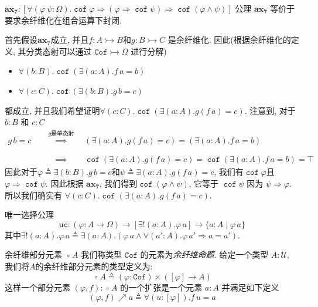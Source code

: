 \documentclass[aspectratio=169,xcolor=dvipsnames]{beamer}
\newcommand\calU{\mathcal{U}}
\newcommand{\ax}[1]{\mathbf{ax_{#1}}}
\newcommand\uc{\mathtt{uc}}
\newcommand\Cof{\mathtt{Cof}}
\DeclareMathOperator\cof{\mathtt{cof}}
\DeclareMathOperator\cofibpart{\square}
\begin{document}
\begin{frame}[shrink]{$\ax{7}:[\forall(\varphi\:\psi:\Omega).\cof\varphi\Rightarrow(\varphi\Rightarrow\cof\psi)\Rightarrow\cof(\varphi\land\psi)]$}
  公理 $\ax{7}$ 等价于要求余纤维化在组合运算下封闭.

  首先假设$\ax{7}$成立, 并且$f:A\rightarrowtail B$和$g:B\rightarrowtail C$ 是余纤维化. 因此(根据余纤维化的定义, 其分类态射可以通过 $\Cof\rightarrowtail\Omega$ 进行分解)
  \begin{itemize}
    \item $\forall(b:B).\cof(\exists(a:A).f\,a=b)$
    \item $\forall(c:C).\cof(\exists(b:B).g\,b=c)$
  \end{itemize}
  都成立, 并且我们希望证明$\forall(c:C).\cof(\exists(a:A).g(f\,a)=c)$. 注意到, 对于 $b:B$ 和 $c:C$
  \begin{align*}
    g\,b=c \quad&\stackrel{g\text{是单态射}}{\implies}\quad (\exists(a:A).g(f\,a)=c) = (\exists(a:A).f\,a=b) \\
    &\stackrel{\phantom{g\text{是单态射}}}{\implies}\quad \cof(\exists(a:A).g(f\,a)=c) = \cof(\exists(a:A).f\,a=b) = \top
  \end{align*}
  因此对于$\varphi\triangleq\exists(b:B).g\,b=c$和$\psi\triangleq\exists(a:A).g(f\,a)=c$, 我们有$\cof\varphi$且$\varphi\Rightarrow\cof\psi$. 因此根据 $\ax{7}$, 我们得到$\cof(\varphi\land\psi)$, 它等于 $\cof\psi$ 因为 $\psi\Rightarrow\varphi$. 所以我们确实有 $\forall(c:C).\cof(\exists(a:A).g(f\,a)=c)$.
\end{frame}

\begin{frame}{唯一选择公理}
  \[
  \uc : (\varphi : A \to \Omega) \to [\exists!(a:A).\varphi\,a]\to\{a:A\mid\varphi\,a\}
  \]
  其中$\exists!(a:A).\varphi\,a\triangleq\exists(a:A).(\varphi\,a\land\forall(a':A).\varphi\,a'\Rightarrow a=a')$.
\end{frame}

\begin{frame}{余纤维部分元素 $\cofibpart A$}
  我们称类型 $\Cof$ 的元素为\emph{余纤维命题}. 给定一个类型 $A:\calU$, 我们将$A$的余纤维部分元素的类型定义为:
  \[
  \cofibpart A \triangleq (\varphi : \Cof) \times ([\varphi]\to A)
  \]
  这样一个部分元素 $(\varphi,f):\cofibpart A$ 的一个扩张是一个元素 $a:A$ 并满足如下定义
  \[
  (\varphi,f) \nearrow a \triangleq \forall(u:[\varphi]).f\,u=a
  \]
\end{frame}
\end{document}
